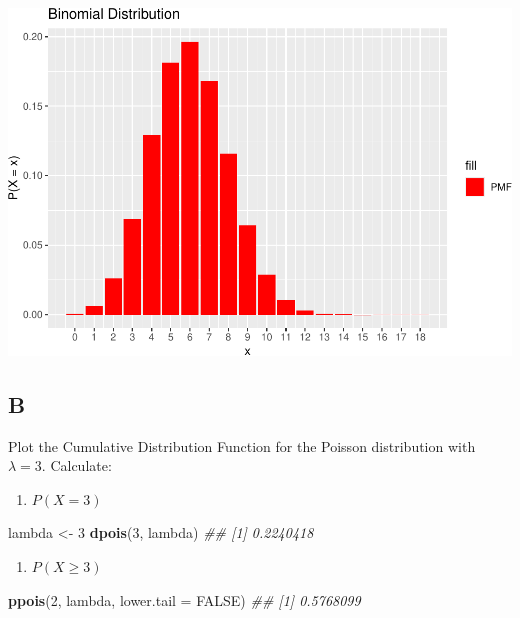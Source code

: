 \documentclass[
]{article}
\newenvironment{Shaded}{\begin{snugshade}}{\end{snugshade}}
\newcommand{\CommentTok}[1]{\textcolor[rgb]{0.56,0.35,0.01}{\textit{#1}}}
\newcommand{\DataTypeTok}[1]{\textcolor[rgb]{0.13,0.29,0.53}{#1}}
\newcommand{\DecValTok}[1]{\textcolor[rgb]{0.00,0.00,0.81}{#1}}
\newcommand{\KeywordTok}[1]{\textcolor[rgb]{0.13,0.29,0.53}{\textbf{#1}}}
\newcommand{\NormalTok}[1]{#1}
\newcommand{\OtherTok}[1]{\textcolor[rgb]{0.56,0.35,0.01}{#1}}
\newcommand{\StringTok}[1]{\textcolor[rgb]{0.31,0.60,0.02}{#1}}
\providecommand{\tightlist}{%
  \setlength{\itemsep}{0pt}\setlength{\parskip}{0pt}}
\begin{document}
\includegraphics{es_files/figure-latex/unnamed-chunk-5-1.pdf}

\hypertarget{b}{%
\subsection{B}\label{b}}

Plot the Cumulative Distribution Function for the Poisson distribution
with \(\lambda = 3\). Calculate:

\begin{enumerate}
\def\labelenumi{\arabic{enumi}.}
\tightlist
\item
  \(P(X=3)\)
\end{enumerate}

\begin{Shaded}
\begin{Highlighting}[]
\NormalTok{lambda \textless{}{-}}\StringTok{ }\DecValTok{3}
\KeywordTok{dpois}\NormalTok{(}\DecValTok{3}\NormalTok{, lambda)}
\CommentTok{\#\# [1] 0.2240418}
\end{Highlighting}
\end{Shaded}

\begin{enumerate}
\def\labelenumi{\arabic{enumi}.}
\setcounter{enumi}{1}
\tightlist
\item
  \(P(X \ge 3)\)
\end{enumerate}

\begin{Shaded}
\begin{Highlighting}[]
\KeywordTok{ppois}\NormalTok{(}\DecValTok{2}\NormalTok{, lambda, }\DataTypeTok{lower.tail =} \OtherTok{FALSE}\NormalTok{)}
\CommentTok{\#\# [1] 0.5768099}
\end{Highlighting}
\end{Shaded}
\end{document}
